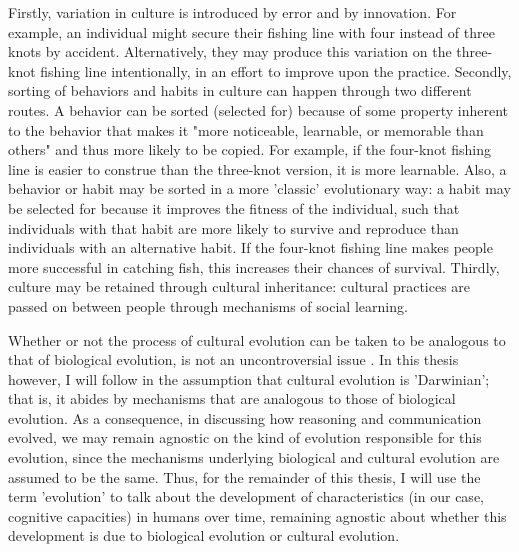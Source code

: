 Firstly, variation in culture is introduced by error and by innovation. For example, an individual might secure their fishing line with four instead of three knots by accident. Alternatively, they may produce this variation on the three-knot fishing line intentionally, in an effort to improve upon the practice.
Secondly, sorting of behaviors and habits in culture can happen through two different routes. A behavior can be sorted (selected for) because of some property inherent to the behavior that makes it "more noticeable, learnable, or memorable than others" \citep[p.~34]{Heyes18} and thus more likely to be copied. For example, if the four-knot fishing line is easier to construe than the three-knot version, it is more learnable.
Also, a behavior or habit may be sorted in a more 'classic' evolutionary way: a habit may be selected for because it improves the fitness of the individual, such that individuals with that habit are more likely to survive and reproduce than individuals with an alternative habit. If the four-knot fishing line makes people more successful in catching fish, this increases their chances of survival.
Thirdly, culture may be retained through cultural inheritance: cultural practices are passed on between people through mechanisms of social learning.

Whether or not the process of cultural evolution can be taken to be analogous to that of biological evolution, is not an uncontroversial issue \citep[see][for discussion]{Claidiere14, Stanley21}.
In this thesis however, I will follow \citet{Heyes18} in the assumption that cultural evolution is 'Darwinian'; that is, it abides by mechanisms that are analogous to those of biological evolution.
As a consequence, in discussing how reasoning and communication evolved, we may remain agnostic on the kind of evolution responsible for this evolution, since the mechanisms underlying biological and cultural evolution are assumed to be the same.
Thus, for the remainder of this thesis, I will use the term 'evolution' to talk about the development of characteristics (in our case, cognitive capacities) in humans over time, remaining agnostic about whether this development is due to biological evolution or cultural evolution.

